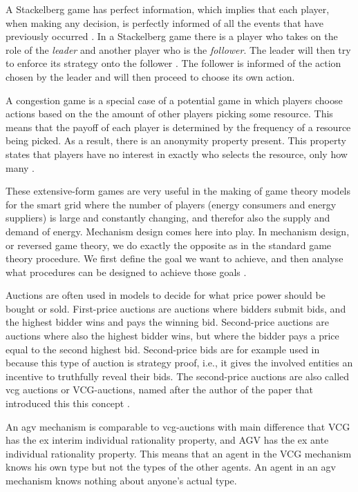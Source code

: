 A Stackelberg game has perfect information, which implies that each player, when making any decision, is perfectly informed of all the events that have previously occurred \cite{CourseInGameTheory}.
In a Stackelberg game there is a player who takes on the role of the \textit{leader} and another player who is the \textit{follower}. The leader will then try to enforce its strategy onto the follower \cite{ShohamLeyton-Brown2008}. The follower is informed of the action chosen by the leader and will then proceed to choose its own action. 

A congestion game is a special case of a potential game \cite{IbarsNavarroGiupponi2010, MondererShapley1996, ShohamLeyton-Brown2008} in which players choose actions based on the the amount of other players picking some resource. This means that the payoff of each player is determined by the frequency of a resource being picked. As a result, there is an anonymity property present. This property states that players have no interest in exactly who selects the resource, only how many \cite{ShohamLeyton-Brown2008}.


These extensive-form games are very useful in the making of game theory models for the smart grid where the number of players (energy consumers and energy suppliers) is large and constantly changing, and therefor also the supply and demand of energy. Mechanism design comes here into play. In mechanism design, or reversed game theory, we do exactly the opposite as in the standard game theory procedure. We first define the goal we want to achieve, and then analyse what procedures can be designed to achieve those goals \cite{SalfatiRabinovici2014}. 

Auctions are often used in models to decide for what price power should be bought or sold. First-price auctions are auctions where bidders submit bids, and the highest bidder wins and pays the winning bid. Second-price auctions are auctions where also the highest bidder wins, but where the bidder pays a price equal to the second highest bid. Second-price bids are for example used in \cite{SaadHanPoorEtAl2011} because this type of auction is strategy proof, i.e., it gives the involved entities an incentive to truthfully reveal their bids. The second-price auctions are also called \ac{vcg} auctions or VCG-auctions, named after the author of the paper that introduced this this concept \cite{Vickrey1961}.

An \ac{agv} mechanism is comparable to \ac{vcg}-auctions with main difference that VCG has the ex interim individual rationality property, and AGV has the ex ante individual rationality property\cite{ShohamLeyton-Brown2008}. This means that an agent in the VCG mechanism knows his own type but not the types of the other agents. An agent in an \ac{agv} mechanism knows nothing about anyone’s actual type. 

